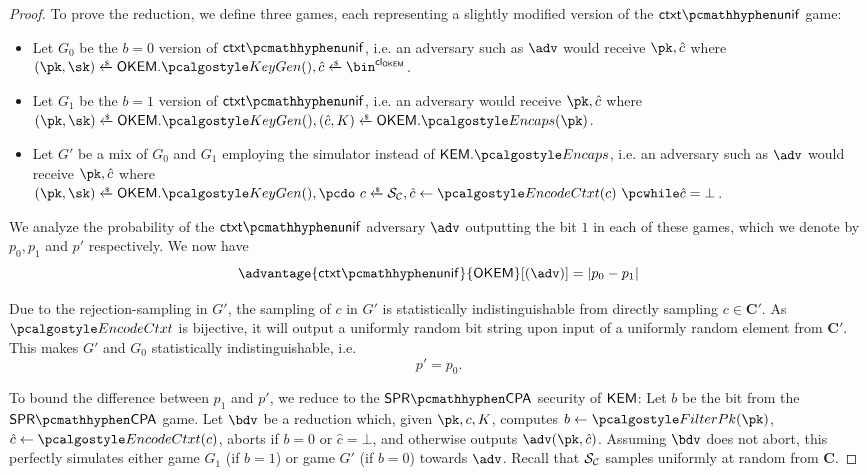 \begin{proof}
    To prove the reduction, we define three games, each representing a slightly modified version of the $\ctxtunif$ game:
    \begin{itemize}
        \item Let $G_0$ be the $b=0$ version of $\ctxtunif$, i.e. an adversary such as $\adv$ would receive $\pk, \hat c$ where 
        $(\pk,\sk) \getsr \OKEM.\kgen(), \hat c \getsr \bin^\obfctxtlen$.
        \item Let $G_1$ be the $b=1$ version of $\ctxtunif$, i.e. an adversary would receive $\pk, \hat c$ where\\
        $(\pk,\sk) \getsr \OKEM.\kgen(), (\hat c, K) \getsr \OKEM.\encaps(\pk)$.
        \item Let $G'$ be a mix of $G_0$ and $G_1$ employing the simulator instead of $\KEM.\encaps$, i.e. an adversary such as $\adv$ would receive $\pk, \hat c$ where\\
        $(\pk,\sk) \getsr \OKEM.\kgen(), \pcdo\ c \getsr \simulunif, \hat c \gets \encodectxt(c)\ \pcwhile \hat c = \bot$.
    \end{itemize}

    We analyze the probability of the $\ctxtunif$ adversary $\adv$ outputting the bit $1$ in each of these games, which we denote by $p_0, p_1$ and $p'$ respectively.
    We now have
    \[
        \advantage{\ctxtunif}{\OKEM}[(\adv)] = \left| p_0 - p_1 \right|
    \]

    Due to the rejection-sampling in $G'$, the sampling of $c$ in $G'$ is statistically indistinguishable from directly sampling $c \in \mathbf{C}'$. As $\encodectxt$ is bijective, it will output a uniformly random bit string upon input of a uniformly random element from $\mathbf{C}'$. This makes $G'$ and $G_0$ statistically indistinguishable, i.e.
    \[ p' = p_0. \]

    To bound the difference between $p_1$ and $p'$, we reduce to the $\sprcpa$ security of $\mathsf{KEM}$:
    Let $b$ be the bit from the $\sprcpa$ game. Let $\bdv$ be a reduction which, given $\pk, c, K$, computes $b \gets \filterpk(\pk)$, $\hat c \gets \encodectxt(c)$, aborts if $b=0$ or $\hat c = \bot$, and otherwise outputs $\adv(\pk, \hat c)$.
    Assuming $\bdv$ does not abort, this perfectly simulates either game $G_1$ (if $b=1$) or game $G'$ (if $b=0$) towards $\adv$. Recall that $\mathcal{S}_\mathcal{C}$ samples uniformly at random from $\mathbf{C}$.
    

\end{proof}
